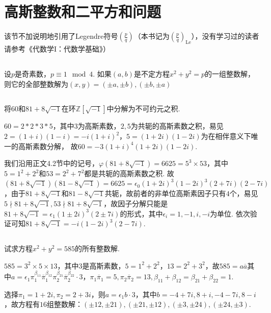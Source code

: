\section{高斯整数和二平方和问题}
该节不加说明地引用了Legendre符号$\displaystyle\left(\frac{p}{q}\right)$（本书记为$\displaystyle\left(\frac{p}{q}\right)_{\mathrm{Le}}$），没有学习过的读者请参考《代数学I：代数学基础》）
\subsection{}
设$p$是奇素数，$p\equiv 1\mod 4$. 如果$(a,b)$是不定方程$x^2+y^2=p$的一组整数解，则它的全部整数解为$(x,y)=(\pm a,\pm b), (\pm b,\pm a)$


\subsection{}
将$60$和$81+8\sqrt{-1}$在环$\mathbb{Z}[\sqrt{-1}]$中分解为不可约元之积.

\jie
$60=2*2*3*5$，其中$3$为高斯素数，$2,5$为共轭的高斯素数之积，易见
$2=(1+i)(1-i)=-i(1+i)^2$，$5=(1+2i)(1-2i)$为在相伴意义下唯一的高斯素数分解，
故$60=-3(1+i)^4(1+2i)(1-2i)$.

我们沿用正文4.2节中的记号，$\varphi(81+8\sqrt{-1})=6625=5^3\times 53$，其中$5=1^2+2^2$和$53=2^2+7^2$都是共轭的高斯素数之积.
故$(81+8\sqrt{-1})(81-8\sqrt{-1})=6625=\epsilon_0(1+2i)^3(1-2i)^3(2+7i)(2-7i)$，由于$81+8\sqrt{-1}$和$81-8\sqrt{-1}$共轭，故前者的非单位高斯素因子只有$4$个，易见$5\nmid 81+8\sqrt{-1}, 53\nmid 81+8\sqrt{-1}$，故因子分解只能是$81+8\sqrt{-1}=\epsilon_1(1\pm 2i)^3(2\pm 7i)$的形式，其中$\epsilon_i=1,-1,i,-i$为单位. 依次验证可知$81+8\sqrt{-1}=-i(1-2i)^3(2-7i)$.

\subsection{}
试求方程$x^2+y^2=585$的所有整数解.

\jie $585=3^2\times 5\times 13$，其中$3$是高斯素数，$5=1^2+2^2$，$13=2^2+3^2$，故$585=a\overline{a}$其中$a=\epsilon_1\pi_1^{\beta_{11}}\overline{\pi}_1^{\beta_{12}}\pi_2^{\beta_{21}}\overline{\pi}_2^{\beta_{22}}\cdot 3$，$\pi_1\overline{\pi}_1=5, \pi_2\overline{\pi}_2=13, \beta_{11}+\beta_{12}=\beta_{21}+\beta_{22}=1$.

选择$\pi_1=1+2i, \pi_2=2+3i$，则$a=\epsilon_1b\cdot 3$，其中$b=-4+7i, 8+i, -4-7i, 8-i$，故方程有$16$组整数解：$(\pm 12, \pm 21), (\pm 21, \pm 12), (\pm 3, \pm 24), (\pm 24, \pm 3)$.

